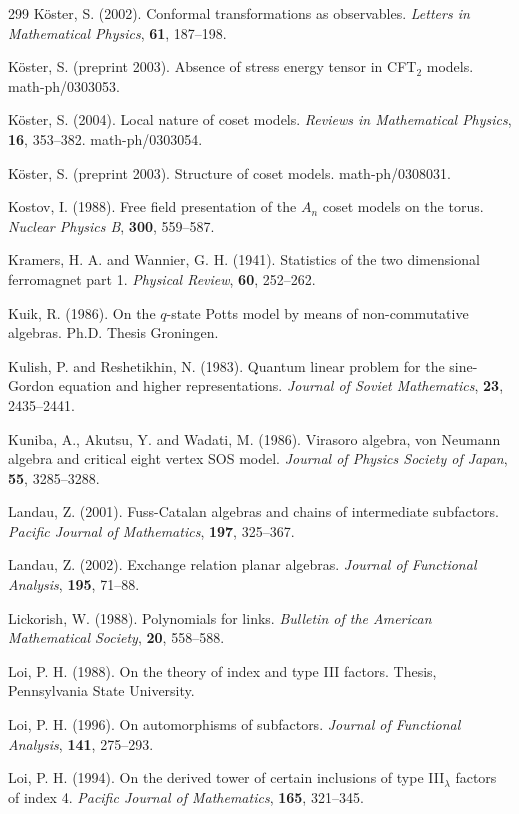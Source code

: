 \documentclass[12pt]{article}
\theoremstyle{plain}
\theoremstyle{definition}
\numberwithin{equation}{section}
\begin{document}
\begin{thebibliography} {299}
K\"oster, S. (2002).
Conformal transformations as observables.
{\em Letters in Mathematical Physics},
{\bf 61}, 187--198.

K\"oster, S. (preprint 2003).
Absence of stress energy tensor in CFT$_2$ models.
math-ph/0303053.

K\"oster, S. (2004).
Local nature of coset models.
{\em Reviews in Mathematical Physics},
{\bf 16}, 353--382.
math-ph/0303054.

K\"oster, S. (preprint 2003).
Structure of coset models.
math-ph/0308031.

Kostov, I. (1988).
Free field presentation of the $A_n$ coset models on the torus.
{\em Nuclear Physics B}, {\bf 300}, 559--587.

Kramers, H. A. and Wannier, G. H. (1941).
Statistics of the two dimensional ferromagnet part 1.
{\em Physical Review}, {\bf 60}, 252--262.

Kuik, R. (1986).
On the $q$-state Potts model by means of non-commutative algebras.
Ph.D. Thesis Groningen.

Kulish, P. and Reshetikhin, N. (1983).
Quantum linear problem for the sine-Gordon equation
and higher representations.
{\em Journal of Soviet Mathematics},
{\bf 23}, 2435--2441.

Kuniba, A., Akutsu, Y. and Wadati, M. (1986).
Virasoro algebra, von Neumann algebra
and critical eight vertex SOS model.
{\em Journal of Physics Society of Japan}, {\bf 55}, 3285--3288.

Landau, Z. (2001).
Fuss-Catalan algebras and chains of intermediate subfactors.
{\em Pacific Journal of Mathematics},
{\bf 197}, 325--367.

Landau, Z. (2002).
Exchange relation planar algebras.
{\em Journal of Functional Analysis}, {\bf 195}, 71--88.

Lickorish, W. (1988).
Polynomials for links.
{\em Bulletin of the American Mathematical Society},
{\bf 20}, 558--588.

Loi, P. H. (1988).
On the theory of index and type III factors.
Thesis, Pennsylvania State University.

Loi, P. H. (1996).
On automorphisms of subfactors.
{\em Journal of Functional Analysis},
{\bf 141}, 275--293.

Loi, P. H. (1994).
On the derived tower of certain inclusions of type
III$_\lambda$ factors of index 4.
{\em Pacific Journal of Mathematics},
{\bf 165}, 321--345.


\end{thebibliography}
\end{document}
